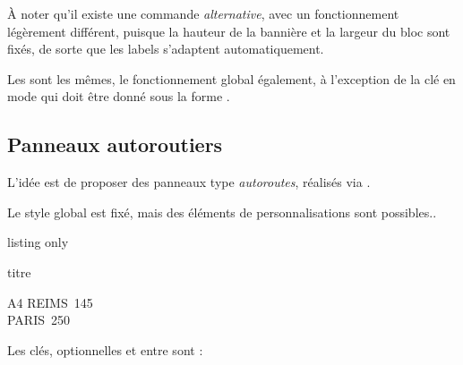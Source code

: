 \documentclass[french,11pt,a4paper]{article}
\begin{document}
\pagebreak

À noter qu'il existe une commande \textit{alternative}, avec un fonctionnement légèrement différent, puisque la hauteur de la bannière et la largeur du bloc sont fixés, de sorte que les labels s'adaptent automatiquement.

Les  sont les mêmes, le fonctionnement global également, à l'exception de la clé \MontreCode{[customtype]} en mode  qui doit être donné sous la forme \MontreCode{[customtype=L1+L2]}.

\begin{DemoCode}{}

\end{DemoCode}

\pagebreak

\subsection{Panneaux autoroutiers}

L'idée est de proposer des panneaux type \textit{autoroutes}, réalisés via .

Le style global est fixé, mais des éléments de personnalisations sont possibles..

\begin{DemoCode}{listing only}
\begin{PanneauAutoroute}[clés]{titre}
\end{PanneauAutoroute}
\end{DemoCode}

\begin{DemoCode}{}
\begin{PanneauAutoroute}{A4}
REIMS\hfill~145\\
PARIS\hfill~250
\end{PanneauAutoroute}
\end{DemoCode}

Les clés, optionnelles et entre \MontreCode{[...]} sont :
\end{document}
